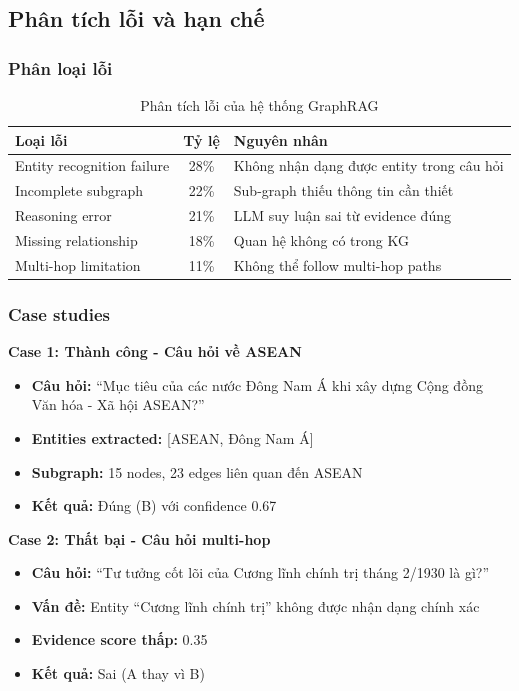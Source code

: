 \subsection{Phân tích lỗi và hạn chế}

\subsubsection{Phân loại lỗi}

\begin{table}[H]
\centering
\caption{Phân tích lỗi của hệ thống GraphRAG}
\label{tab:graphrag-errors}
\begin{tabular}{|l|c|l|}
\hline
\textbf{Loại lỗi} & \textbf{Tỷ lệ} & \textbf{Nguyên nhân} \\
\hline
Entity recognition failure & 28\% & Không nhận dạng được entity trong câu hỏi \\
Incomplete subgraph & 22\% & Sub-graph thiếu thông tin cần thiết \\
Reasoning error & 21\% & LLM suy luận sai từ evidence đúng \\
Missing relationship & 18\% & Quan hệ không có trong KG \\
Multi-hop limitation & 11\% & Không thể follow multi-hop paths \\
\hline
\end{tabular}
\end{table}

\subsubsection{Case studies}

\textbf{Case 1: Thành công - Câu hỏi về ASEAN}

\begin{itemize}
    \item \textbf{Câu hỏi:} ``Mục tiêu của các nước Đông Nam Á khi xây dựng Cộng đồng Văn hóa - Xã hội ASEAN?''
    \item \textbf{Entities extracted:} [ASEAN, Đông Nam Á]
    \item \textbf{Subgraph:} 15 nodes, 23 edges liên quan đến ASEAN
    \item \textbf{Kết quả:} Đúng (B) với confidence 0.67
\end{itemize}

\textbf{Case 2: Thất bại - Câu hỏi multi-hop}

\begin{itemize}
    \item \textbf{Câu hỏi:} ``Tư tưởng cốt lõi của Cương lĩnh chính trị tháng 2/1930 là gì?''
    \item \textbf{Vấn đề:} Entity ``Cương lĩnh chính trị'' không được nhận dạng chính xác
    \item \textbf{Evidence score thấp:} 0.35
    \item \textbf{Kết quả:} Sai (A thay vì B)
\end{itemize}

